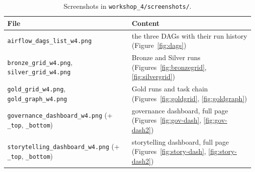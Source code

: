 \documentclass[stu, 12pt, letterpaper, donotrepeattitle, floatsintext, natbib]{apa7}
\begin{document}
\begin{table}[H]
\centering
\footnotesize
\caption{Screenshots in \texttt{workshop\_4/screenshots/}.}
\label{tab:screens}
\begin{tabular}{@{}ll@{}}
\toprule
File & Content \\
\midrule
\texttt{airflow\_dags\_list\_w4.png} & the three DAGs with their run history (Figure~\ref{fig:dags}) \\
\texttt{bronze\_grid\_w4.png}, \texttt{silver\_grid\_w4.png} & Bronze and Silver runs (Figures~\ref{fig:bronzegrid}, \ref{fig:silvergrid}) \\
\texttt{gold\_grid\_w4.png}, \texttt{gold\_graph\_w4.png} & Gold runs and task chain (Figures~\ref{fig:goldgrid}, \ref{fig:goldgraph}) \\
\texttt{governance\_dashboard\_w4.png} (+ \texttt{\_top}, \texttt{\_bottom}) & governance dashboard, full page (Figures~\ref{fig:gov-dash}, \ref{fig:gov-dash2}) \\
\texttt{storytelling\_dashboard\_w4.png} (+ \texttt{\_top}, \texttt{\_bottom}) & storytelling dashboard, full page (Figures~\ref{fig:story-dash}, \ref{fig:story-dash2}) \\
\bottomrule
\end{tabular}
\end{table}

\end{document}
